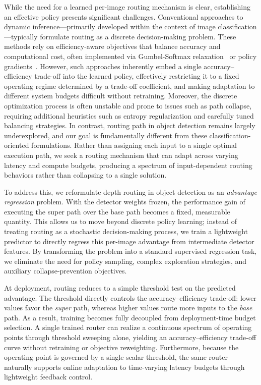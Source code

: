 While the need for a learned per-image routing mechanism is clear, establishing an effective policy presents significant challenges. 
Conventional approaches to dynamic inference—primarily developed within the context of image classification—typically formulate routing as a discrete decision-making problem. 
These methods rely on efficiency-aware objectives that balance accuracy and computational cost, often implemented via Gumbel-Softmax relaxation~\cite{guo2019spottune, meng2020ar} or policy gradients~\cite{wu2018blockdrop}.
However, such approaches inherently embed a single accuracy–efficiency trade-off into the learned policy, effectively restricting it to a fixed operating regime determined by a trade-off coefficient, and making adaptation to different system budgets difficult without retraining. 
Moreover, the discrete optimization process is often unstable and prone to issues such as path collapse, requiring additional heuristics such as entropy regularization and carefully tuned balancing strategies. 
In contrast, routing path in object detection remains largely underexplored, and our goal is fundamentally different from these classification-oriented formulations. 
Rather than assigning each input to a single optimal execution path, we seek a routing mechanism that can adapt across varying latency and compute budgets, producing a spectrum of input-dependent routing behaviors rather than collapsing to a single solution.


To address this, we reformulate depth routing in object detection as an \emph{advantage regression} problem. With the detector weights frozen, the performance gain of executing the super path over the base path becomes a fixed, measurable quantity. 
This allows us to move beyond discrete policy learning; instead of treating routing as a stochastic decision-making process, we train a lightweight predictor to directly regress this per-image advantage from intermediate detector features. 
By transforming the problem into a standard supervised regression task, we eliminate the need for policy sampling, complex exploration strategies, and auxiliary collapse-prevention objectives.


At deployment, routing reduces to a simple threshold test on the predicted advantage. 
The threshold directly controls the accuracy--efficiency trade-off: lower values favor the \emph{super} path, whereas higher values route more inputs to the \emph{base} path. As a result, training becomes fully decoupled from deployment-time budget selection. A single trained router can realize a continuous spectrum of operating points through threshold sweeping alone, yielding an accuracy--efficiency trade-off curve without retraining or objective reweighting. Furthermore, because the operating point is governed by a single scalar threshold, the same router naturally supports online adaptation to time-varying latency budgets through lightweight feedback control.


